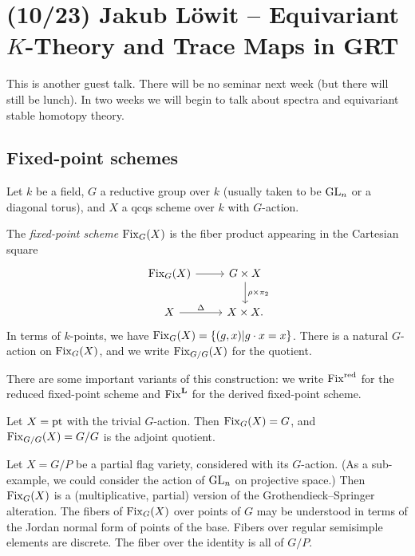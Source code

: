 \documentclass{article}
\begin{document}
\section{(10/23) Jakub L\"owit -- Equivariant $K$-Theory and Trace Maps in GRT}

This is another guest talk.
There will be no seminar next week (but there will still be lunch).
In two weeks we will begin to talk about spectra and equivariant stable homotopy theory.

\subsection{Fixed-point schemes}

Let $k$ be a field, $G$ a reductive group over $k$ (usually taken to be $\operatorname{GL}_n$ or a diagonal torus), and $X$ a qcqs scheme over $k$ with $G$-action.

\begin{dfn}
  The \emph{fixed-point scheme} $\operatorname{Fix}_G(X)$ is the fiber product appearing in the Cartesian square
  \[
    \begin{tikzcd}
      \Fix_G(X) \rar & G \times X \dar["\rho \times \pi_2"] \\
      X \rar["\Delta"] & X \times X.
    \end{tikzcd}
  \]
  In terms of $k$-points, we have $\operatorname{Fix}_G(X) = \{ (g, x) | g \cdot x = x \}$.
  There is a natural $G$-action on $\operatorname{Fix}_G(X)$, and we write $\operatorname{Fix}_{G/G}(X)$ for the quotient.
\end{dfn}

\begin{rmk}
  There are some important variants of this construction: we write $\operatorname{Fix}^{\mathrm{red}}$ for the reduced fixed-point scheme and $\operatorname{Fix}^{\mathbf{L}}$ for the derived fixed-point scheme.
\end{rmk}

\begin{ex}
  Let $X = \operatorname{pt}$ with the trivial $G$-action.
  Then $\operatorname{Fix}_G(X) = G$, and $\operatorname{Fix}_{G/G}(X) = G/G$ is the adjoint quotient.
\end{ex}

\begin{ex}
  Let $X = G / P$ be a partial flag variety, considered with its $G$-action.
  (As a sub-example, we could consider the action of $\operatorname{GL}_n$ on projective space.)
  Then $\operatorname{Fix}_G(X)$ is a (multiplicative, partial) version of the Grothendieck--Springer alteration.
  The fibers of $\operatorname{Fix}_G(X)$ over points of $G$ may be understood in terms of the Jordan normal form of points of the base.
  Fibers over regular semisimple elements are discrete.
  The fiber over the identity is all of $G / P$.
\end{ex}
\end{document}
